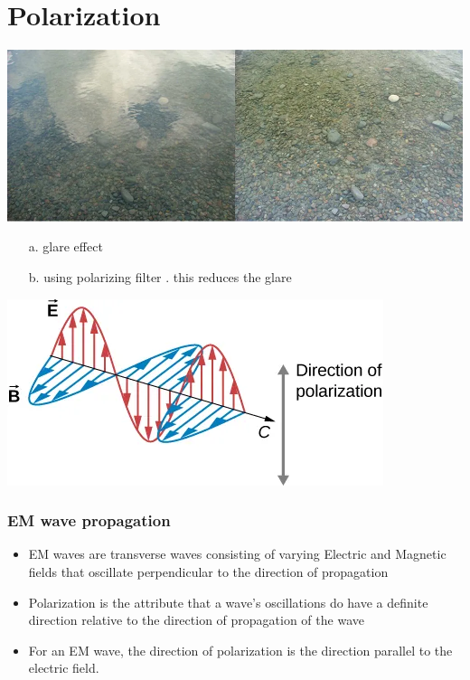 \documentclass{beamer}
\begin{document}
\section{Polarization}
\begin{frame}
	\begin{center}
		\includegraphics[scale=0.3]{33.png}
	\end{center}
	\begin{enumerate}
		\item [a.] glare effect 
		\item [b.] using polarizing filter . this reduces the glare
	\end{enumerate}
\end{frame}
\begin{frame}
	\begin{center}
		\includegraphics[scale=0.8]{34.png}
	\end{center}
\end{frame}
\begin{frame}
	\frametitle{EM wave propagation}
	\begin{itemize}
		\item EM waves are transverse waves consisting of varying Electric and Magnetic fields that oscillate perpendicular to the direction of propagation
	
		\item \alert{Polarization} is the attribute that a wave’s oscillations do have a definite direction relative to the direction of propagation of the wave
		
		\item For an EM wave, the direction of polarization is the direction parallel to the electric field.
	\end{itemize}
\end{frame}
\end{document}
